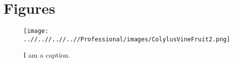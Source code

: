 \documentclass[11pt]{article}
\begin{document}
\citep{ospreebbms}




\clearpage
\section{Figures}

\begin{figure}[h!]
\texttt{[image: ..//..//..//..//Professional/images/ColylusVineFruit2.png]}
\caption{I am a caption.} 
\label{fig:figname}
\end{figure}
\end{document}
